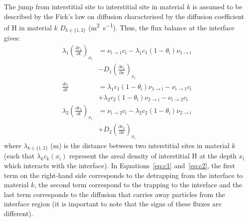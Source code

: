 \indent The jump from interstitial site to interstitial site in material $k$ is assumed to be described by the Fick's law on diffusion characterised by the diffusion coefficient of H in material $k$ $D_{k\in\lbrace 1,2\rbrace}$ (\si{m^{2}.s^{-1}}).
Thus, the flux balance at the interface gives:
\begin{align}
\lambda_1 \left( \frac{\partial c_1}{\partial t} \right)_{x_\mathrm{i}}
                      &= \nu_{\mathrm{i}\rightarrow 1}c_\mathrm{i}
                        -\lambda_1 c_1(1-\theta_\mathrm{i})\nu_{1\rightarrow\mathrm{i}}  \nonumber
                        \\&-D_1\left(\frac{\partial c_1}{\partial x}\right)_{x_\mathrm{i}}
                        \label{eq:c1}
                        \\
\frac{d c_\mathrm{i}}{d t} 
                     &= \lambda_1 c_1 (1-\theta_\mathrm{i})\nu_{1\rightarrow\mathrm{i}}
                       - \nu_{i\rightarrow 1}c_\mathrm{i} \nonumber
                       \\ &+\lambda_2 c_2 (1-\theta_\mathrm{i})\nu_{2\rightarrow\mathrm{i}}
                       - \nu_{i\rightarrow 2}c_\mathrm{i}
                       \label{eq:ci}
                       \\
\lambda_2 \left( \frac{\partial c_2}{\partial t}\right)_{x_\mathrm{i}}
                    &= \nu_{\mathrm{i}\rightarrow 2}c_\mathrm{i}
                      -\lambda_2 c_2 (1-\theta_\mathrm{i})\nu_{2\rightarrow\mathrm{i}} \nonumber
                      \\ &+D_2 \left(\frac{\partial c_2}{\partial x}\right)_{x_\mathrm{i}}
                      \label{eq:c2}
\end{align}
where $\lambda_{k\in\lbrace 1,2 \rbrace}$ (\si{m}) is the distance between two interstitial sites in material $k$ (such that $\lambda_k c_k(x_\mathrm{i})$ represent the areal density of interstitial H at the depth $x_\mathrm{i}$ which interacts with the interface).
In Equations~\ref{eq:c1} and~\ref{eq:c2}, the first term on the right-hand side corresponds to the detrapping from the interface to material $k$, the second term correspond to the trapping to the interface and the last term corresponds to the diffusion that carries away particles from the interface region (it is important to note that the signs of these fluxes are different).\\
